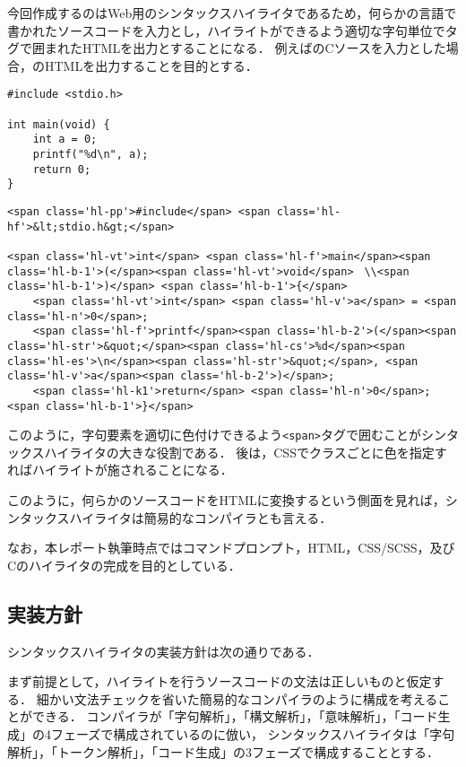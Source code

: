 \documentclass[autodetect-engine,dvi=dvipdfmx,ja=standard,
               a4j,11pt]{bxjsarticle}
\newcommand{\figref}[1]{\makebox{図~\ref{#1}}}
\begin{document}
今回作成するのはWeb用のシンタックスハイライタであるため，何らかの言語で書かれたソースコードを入力とし，ハイライトができるよう適切な字句単位でタグで囲まれたHTMLを出力とすることになる．
例えば\figref{prog:ex-c}のCソースを入力とした場合，\figref{prog:ex-res}のHTMLを出力することを目的とする．

\begin{lstlisting}[caption={シンタックスハイライタへの入力(C言語)}, label={prog:ex-c}]
#include <stdio.h>

int main(void) {
    int a = 0;
    printf("%d\n", a);
    return 0;
}
\end{lstlisting}

\begin{lstlisting}[caption={シンタックスハイライタの出力}, label={prog:ex-res}]
<span class='hl-pp'>#include</span> <span class='hl-hf'>&lt;stdio.h&gt;</span>

<span class='hl-vt'>int</span> <span class='hl-f'>main</span><span class='hl-b-1'>(</span><span class='hl-vt'>void</span>　\\<span class='hl-b-1'>)</span> <span class='hl-b-1'>{</span>
    <span class='hl-vt'>int</span> <span class='hl-v'>a</span> = <span class='hl-n'>0</span>;
    <span class='hl-f'>printf</span><span class='hl-b-2'>(</span><span class='hl-str'>&quot;</span><span class='hl-cs'>%d</span><span class='hl-es'>\n</span><span class='hl-str'>&quot;</span>, <span class='hl-v'>a</span><span class='hl-b-2'>)</span>;
    <span class='hl-k1'>return</span> <span class='hl-n'>0</span>;
<span class='hl-b-1'>}</span>
\end{lstlisting}
%
このように，字句要素を適切に色付けできるよう\verb|<span>|タグで囲むことがシンタックスハイライタの大きな役割である．
後は，CSSでクラスごとに色を指定すればハイライトが施されることになる．

このように，何らかのソースコードをHTMLに変換するという側面を見れば，シンタックスハイライタは簡易的なコンパイラとも言える．

なお，本レポート執筆時点ではコマンドプロンプト，HTML，CSS/SCSS，及びCのハイライタの完成を目的としている．

\subsection{実装方針}

シンタックスハイライタの実装方針は次の通りである．

まず前提として，ハイライトを行うソースコードの文法は正しいものと仮定する．
細かい文法チェックを省いた簡易的なコンパイラのように構成を考えることができる．
コンパイラが「字句解析」，「構文解析」，「意味解析」，「コード生成」の4フェーズで構成されているのに倣い，
シンタックスハイライタは「字句解析」，「トークン解析」，「コード生成」の3フェーズで構成することとする．
\end{document}
